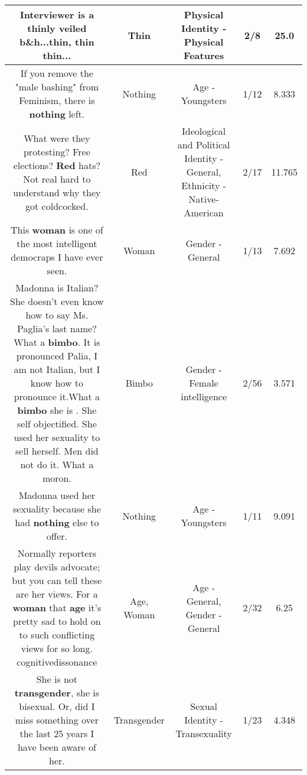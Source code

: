 \documentclass[11pt]{article}
\newlength\mylength
\begin{document}
\begin{center}
\begin{longtable}{|C{.65\mylength}|C{.30\mylength}|C{.12\mylength}|C{.12\mylength}|C{.12\mylength}|}
  \small Interviewer is a thinly veiled b\&h...\textbf{thin}, \textbf{thin} \textbf{thin}...\normalsize   & Thin & Physical Identity - Physical Features & 2/8 & 25.0 \\  \hline
  \small If you remove the "male bashing" from Feminism, there is \textbf{nothing} left.\normalsize   & Nothing & Age - Youngsters & 1/12 & 8.333 \\  \hline
  \small What were they protesting? Free elections? \textbf{R\textbf{ed}} hats? Not real hard to understand why they got coldcocked.\normalsize   & Red &  Ideological and Political Identity - General, Ethnicity - Native-American & 2/17 & 11.765 \\  \hline
  \small This \textbf{woman} is one of the most intelligent democraps I have ever seen.\normalsize   & Woman & Gender - General & 1/13 & 7.692 \\  \hline
  \small Madonna is Italian? She doesn't even know how to say Ms. Paglia's last name? What a \textbf{bimbo}. It is pronounced Palia, I am not Italian, but I know how to pronounce it.What a \textbf{bimbo} she is . She self objectified. She used her sexuality to sell herself. Men did not do it. What a moron.\normalsize   & Bimbo & Gender - Female intelligence & 2/56 & 3.571 \\  \hline
  \small Madonna used her sexuality because she had \textbf{nothing} else to offer.\normalsize   & Nothing & Age - Youngsters & 1/11 & 9.091 \\  \hline
  \small Normally reporters play devils advocate; but you can tell these are her views. For a \textbf{woman} that \textbf{age} it's pretty sad to hold on to such conflicting views for so long. cognitivedissonance\normalsize   & Age, Woman & Age - General, Gender - General & 2/32 & 6.25 \\  \hline
  \small She is not \textbf{transgender}, she is bisexual.  Or, did I miss something over the last 25 years I have been aware of her.\normalsize   & Transgender & Sexual Identity - Transexuality & 1/23 & 4.348 \\  \hline

\end{longtable}
\end{center}
\end{document}
